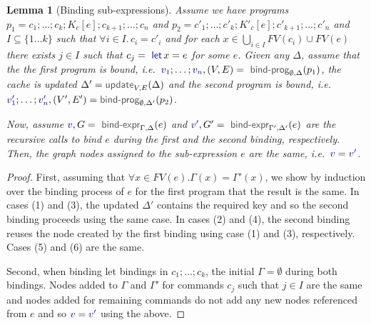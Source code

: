 \documentclass[acmsmall,anonymous,fleqn]{acmart}\settopmatter{printfolios=false,printccs=false,printacmref=false}
\newcounter{thc}
\theoremstyle{plain}
\newtheorem{lem}[thc]{Lemma}
\theoremstyle{definition}
\newcommand{\ident}[1]{\textnormal{\textcolor{idclr}{\sffamily #1}}}
\newcommand{\kvd}[1]{\textnormal{\textcolor{kvdclr}{\sffamily #1}}}
\newcommand{\bndclr}[1]{\textcolor{kvdclr}{#1}}
\begin{document}

\begin{lem}[Binding sub-expressions]
\label{thm:sub-expr}
Assume we have programs $p_1 = c_1; \ldots; c_k; K_c[e]; c_{k+1};\ldots; c_n$ and
$p_2 = c'_1; \ldots; c'_k; K'_c[e]; c'_{k+1};\ldots;c'_n$ and $I\subseteq \{1\ldots k\}$ such
that $\forall i\!\in\!I.\,c_i\!=\!c'_i$ and for each $x \in \bigcup_{i\in I}FV(c_i) \cup FV(e)$
there exists $j\in I$ such that $c_j = \kvd{let}\,x=e$ for some $e$.
%
Given any $\Delta$, assume that the the first program is bound,
i.e.~$\bndclr{v_1};\ldots;\bndclr{v_n}, (V, E) = \ident{bind-prog}_{\emptyset, \Delta}(p_1)$,
the cache is updated $\Delta' = \ident{update}_{V, E}(\Delta)$ and the second
program is bound,
i.e.~$\bndclr{v'_1};\ldots;\bndclr{v'_n}, (V', E') = \ident{bind-prog}_{\emptyset, \Delta'}(p_2)$.

Now, assume $\bndclr{v}, G = \ident{bind-expr}_{\Gamma, \Delta}(e)$ and
$\bndclr{v'}, G' = \ident{bind-expr}_{\Gamma', \Delta'}(e)$ are the recursive calls to bind
$e$ during the first and the second binding, respectively. Then, the graph nodes assigned to the
sub-expression $e$ are the same, i.e.~$\bndclr{v} = \bndclr{v'}$.
\end{lem}
\begin{proof}
First, assuming that $\forall x\in FV(e). \Gamma(x) = \Gamma'(x)$, we show by induction over the binding process of $e$
for the first program that the result is the same. In cases (1) and (3), the updated $\Delta'$
contains the required key and so the second binding proceeds using the same case. In cases
(2) and (4), the second binding reuses the node created by the first binding using case (1) and
(3), respectively. Cases (5) and (6) are the same.

Second, when binding let bindings in $c_1; \ldots; c_k$, the initial $\Gamma = \emptyset$ during
both bindings. Nodes added to $\Gamma$ and $\Gamma'$ for commands $c_j$ such that $j\in I$ are
the same and nodes added for remaining commands do not add any new nodes referenced from $e$ and
so $\bndclr{v} = \bndclr{v'}$ using the above.
\end{proof}
\end{document}
